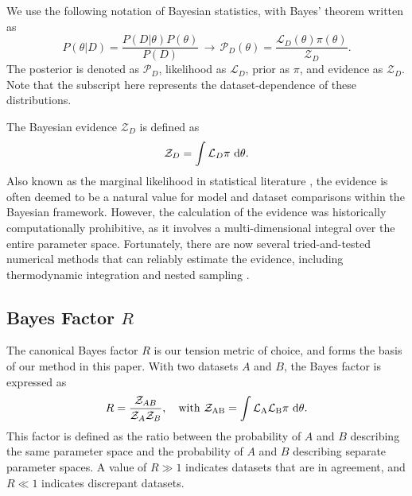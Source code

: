 \documentclass[%
 reprint,
 amsmath,amssymb,
 aps,
]{revtex4-2}
\begin{document}
We use the following notation of Bayesian statistics, with Bayes' theorem written as
\begin{equation}
    P(\theta|D) = \frac{P(D|\theta)P(\theta)}{P(D)} \, \longrightarrow \, \mathcal{P}_D(\theta) = \frac{\mathcal{L}_D(\theta) \pi(\theta)}{\mathcal{Z}_D}.
\end{equation}
The posterior is denoted as $\mathcal{P}_D$, likelihood as $\mathcal{L}_D$, prior as $\pi$, and evidence as $\mathcal{Z}_D$. Note that the subscript here represents the dataset-dependence of these distributions. 

The Bayesian evidence $\mathcal{Z}_D$ is defined as 
\begin{equation}
    \mathcal{Z}_D = \int \mathcal{L}_D \pi \ \rm{d} \theta.
\end{equation}
Also known as the marginal likelihood in statistical literature \cite{Trotta2008}, the evidence is often deemed to be a natural value for model and dataset comparisons within the Bayesian framework. However, the calculation of the evidence was historically computationally prohibitive, as it involves a multi-dimensional integral over the entire parameter space. Fortunately, there are now several tried-and-tested numerical methods that can reliably estimate the evidence, including thermodynamic integration \cite{Lartillot2006} and nested sampling \cite{Skilling2006, Handley2015}.


\subsection{Bayes Factor $R$}

The canonical Bayes factor $R$ \cite{Marshall2006} is our tension metric of choice, and forms the basis of our method in this paper. With two datasets $A$ and $B$, the Bayes factor is expressed as
\begin{equation}
    R = \frac{\mathcal{Z}_{AB}}{\mathcal{Z}_A \mathcal{Z}_B}, \quad \rm{with} \ \mathcal{Z}_{AB} = \int \mathcal{L}_A \mathcal{L}_B \pi \ \rm{d}\theta.
\end{equation}
This factor is defined as the ratio between the probability of $A$ and $B$ describing the same parameter space and the probability of $A$ and $B$ describing separate parameter spaces. A value of $R \gg 1$ indicates datasets that are in agreement, and $R \ll 1$ indicates discrepant datasets.
\end{document}

